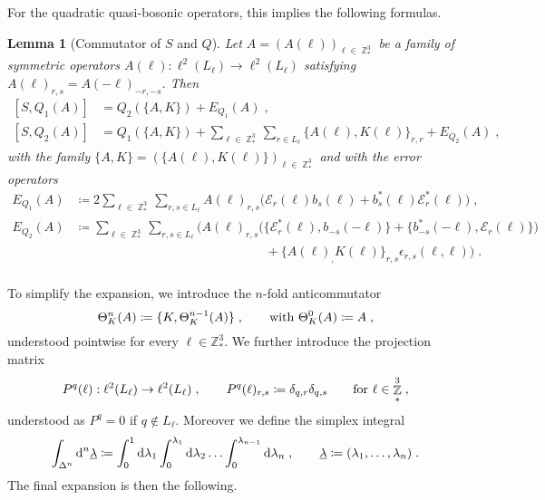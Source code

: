 \documentclass[12pt,a4paper]{article}
\numberwithin{equation}{section}
\newcommand{\Zbb}{\mathbb{Z}}
\newcommand{\ulambda}{\underline{\lambda}}
\newcommand{\1}{\mathbb{I}}
\newcommand{\di}{\textnormal{d}}
\DeclareMathOperator{\Z}{\mathbb{Z}}
\theoremstyle{plain}
\newtheorem{lemma}[theorem]{Lemma}
\theoremstyle{definition}
\theoremstyle{remark}
\theoremstyle{plain}
\theoremstyle{definition}
\theoremstyle{remark}
\begin{document}
For the quadratic quasi-bosonic operators, this implies the following formulas.

\begin{lemma}[Commutator of $S$ and $Q$]\label{lem:Q1Kcomm}
Let $ A = (A(\ell))_{\ell \in \Z^3_*} $ be a family of symmetric operators $ A(\ell) : \ell^2(L_\ell) \to \ell^2(L_\ell) $ satisfying $A(\ell)_{r,s} = A(-\ell)_{-r,-s}$. Then
\begin{equation}
\begin{aligned}
	[S, Q_1(A)] 
	&= Q_2(\{A,K\})
		+ E_{Q_1}(A) \;, \\
	[S, Q_2(A)] 
	&= Q_1\left(\{A,K\} \right) 
		+ \sum_{\ell \in \Z^3_*} \sum_{r \in L_{\ell}} \big\{ A(\ell), K(\ell) \big\}_{r,r}
		+ E_{Q_2}(A) \;,
\end{aligned}
\end{equation}
with the family $ \{A,K\} = (\{A(\ell),K(\ell)\})_{\ell \in \Z^3_*} $ and with the error operators
\begin{equation}\label{eq:errKQ}
\begin{aligned}
	E_{Q_1}(A)
	&\coloneq 2 \sum_{\ell \in \Z^3_*}\sum_{r,s \in L_{\ell}}A(\ell)_{r,s}\Big(\mathcal{E}_{r}(\ell)b_{s}(\ell) + b^*_{s}(\ell)\mathcal{E}^*_{r}(\ell)\Big) \;, \\
	E_{Q_2}(A)
	& \coloneq \sum_{\ell \in \Z^3_*}\sum_{r,s \in L_{\ell}}\Big(A(\ell)_{r,s}\big(\big\{\mathcal{E}^*_{r}(\ell), b_{-s}(-\ell)\big\}
		+ \big\{ b^*_{-s}(-\ell) , \mathcal{E}_r(\ell) \big\} \big) \\
		& \hspace{15em}
		+ \big\{A(\ell)_,K(\ell)\big\}_{r,s}\epsilon_{r,s}(\ell,\ell)\Big) \;. \\
\end{aligned} 
\end{equation}
\end{lemma}


To simplify the expansion, we introduce the $n$-fold anticommutator
\begin{equation} \label{eq:Theta}
	\Theta_K^n (A)
	\coloneq \{ K, \Theta_K^{n-1} (A) \} \;, \qquad
	\textnormal{with }
	\Theta_K^0 (A)
	\coloneq A \;,
\end{equation}
understood pointwise for every $\ell \in \Zbb^3_\ast$.
We further introduce the projection matrix
\begin{equation} \label{eq:Pq}
	P^q(\ell) : \ell^2(L_\ell) \to \ell^2(L_\ell) \;, \qquad
	P^q(\ell)_{r,s} \coloneq \delta_{q,r} \delta_{q,s} \qquad
	\textnormal{for } \ell \in \Z^3_* \;,
\end{equation}
understood as $ P^q = 0 $ if $ q \notin L_\ell $.
Moreover we define the simplex integral
\begin{equation} \label{eq:Deltan}
	\int_{\Delta^n} \di^n \ulambda
	\coloneq \int_0^1 \di \lambda_1 \int_0^{\lambda_1} \di \lambda_2 \ldots \int_0^{\lambda_{n-1}} \di \lambda_n \;, \qquad
	\ulambda \coloneq (\lambda_1, \ldots, \lambda_n) \;.
\end{equation}
 The final expansion is then the following.
\end{document}

